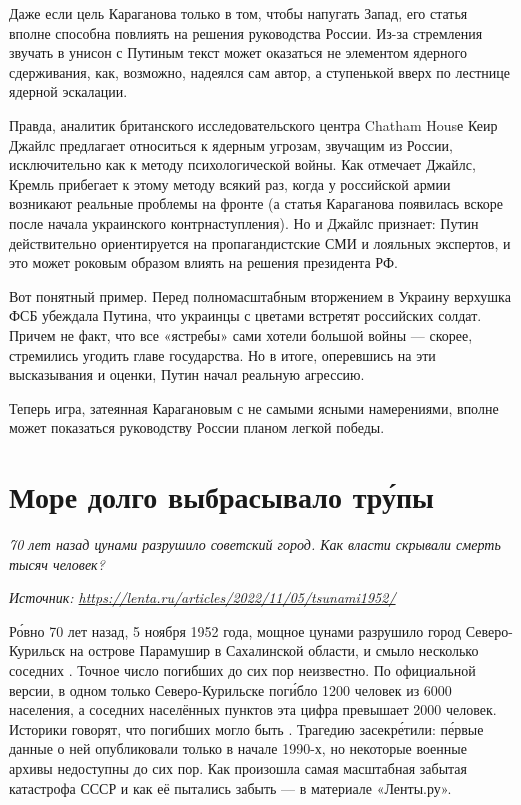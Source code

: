 Даже если цель Караганова только в том, чтобы напугать Запад, его статья вполне способна повлиять на решения руководства России. Из-за стремления звучать в унисон с Путиным текст может оказаться не элементом ядерного сдерживания, как, возможно, надеялся сам автор, а ступенькой вверх по лестнице ядерной эскалации.

Правда, аналитик британского исследовательского центра Chatham Housе Кеир Джайлс предлагает относиться к ядерным угрозам, звучащим из России, исключительно как к методу психологической войны. Как отмечает Джайлс, Кремль прибегает к этому методу всякий раз, когда у российской армии возникают реальные проблемы на фронте (а статья Караганова появилась вскоре после начала украинского контрнаступления). Но и Джайлс признает: Путин действительно ориентируется на пропагандистские СМИ и лояльных экспертов, и это может роковым образом влиять на решения президента РФ.

Вот понятный пример. Перед полномасштабным вторжением в Украину верхушка ФСБ убеждала Путина, что украинцы с цветами встретят российских солдат. Причем не факт, что все «ястребы» сами хотели большой войны — скорее, стремились угодить главе государства. Но в итоге, оперевшись на эти высказывания и оценки, Путин начал реальную агрессию.

Теперь игра, затеянная Карагановым с не самыми ясными намерениями, вполне может показаться руководству России планом легкой победы.


\clearpage


\section{Море долго выбрасывало тр\'{у}пы}

\textit{70 лет назад цунами разрушило советский город. Как власти скрывали смерть тысяч человек?}

\textit{Источник: \url{https://lenta.ru/articles/2022/11/05/tsunami1952/}}

Р\'{о}вно 70 лет назад, 5 ноября 1952 года, мощное цунами разрушило город Северо-Курильск на острове Парамушир в Сахалинской области, и смыло несколько соседних . Точное число погибших до сих пор неизвестно. По официальной версии, в одном только Северо-Курильске пог\'{и}бло 1200 человек из 6000 населения, а  соседних населённых пунктов эта цифра превышает 2000 человек. Историки говорят, что погибших могло быть . Трагедию засекр\'{е}тили: п\'{е}рвые данные о ней опубликовали только в начале 1990-х, но некоторые военные архивы недоступны до сих пор. Как произошла самая масштабная забытая катастрофа СССР и как её пытались забыть --- в материале «Ленты.ру».

